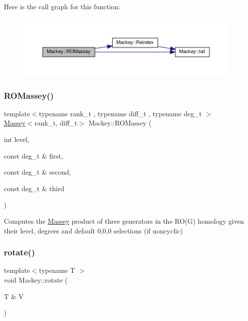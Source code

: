 Here is the call graph for this function\+:\nopagebreak
\begin{figure}[H]
\begin{center}
\leavevmode
\includegraphics[width=350pt]{namespaceMackey_ab75d7bcfa2d92d01bea0d5eef9f48398_cgraph}
\end{center}
\end{figure}
\mbox{\label{namespaceMackey_a7301f53f372c1dc670b4c10f878137a2}} 
\subsubsection{\texorpdfstring{R\+O\+Massey()}{ROMassey()}\hspace{0.1cm}{\footnotesize\ttfamily [2/2]}}
{\footnotesize\ttfamily template$<$typename rank\+\_\+t , typename diff\+\_\+t , typename deg\+\_\+t $>$ \\
\hyperlink{classMackey_1_1Massey}{Massey}$<$rank\+\_\+t, diff\+\_\+t$>$ Mackey\+::\+R\+O\+Massey (\begin{DoxyParamCaption}\item[{int}]{level,  }\item[{const deg\+\_\+t \&}]{first,  }\item[{const deg\+\_\+t \&}]{second,  }\item[{const deg\+\_\+t \&}]{third }\end{DoxyParamCaption})\hspace{0.3cm}{\ttfamily [inline]}}



Computes the \hyperlink{classMackey_1_1Massey}{Massey} product of three generators in the R\+O(\+G) homology given their level, degrees and default 0,0,0 selections (if noncyclic) 

\mbox{\label{namespaceMackey_a38a833de54971845cbdb8c96f830725b}} 
\subsubsection{\texorpdfstring{rotate()}{rotate()}}
{\footnotesize\ttfamily template$<$typename T $>$ \\
void Mackey\+::rotate (\begin{DoxyParamCaption}\item[{T \&}]{V }\end{DoxyParamCaption})}



